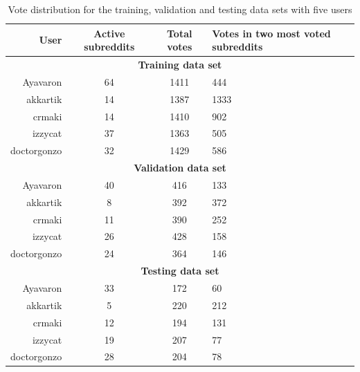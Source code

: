 \begin{table}[H]
    \centering
    \begin{tabular}{ r | c | c | p{4cm}  }
    \hline
    \textbf{User} & \textbf{Active subreddits} & \textbf{Total votes} & \textbf{Votes in two most voted subreddits} \\ \hline \hline
    \multicolumn{4}{c}{\textbf{Training data set}} \\ \hline \hline
    Ayavaron & 64 & 1411 & 444 \\ \hline
    akkartik & 14  & 1387 & 1333 \\ \hline
    crmaki & 14 & 1410 & 902 \\ \hline
    izzycat & 37 & 1363 & 505 \\ \hline
    doctorgonzo & 32 & 1429 & 586 \\ \hline \hline
    \multicolumn{4}{c}{\textbf{Validation data set}} \\ \hline \hline
    Ayavaron & 40 & 416 & 133 \\ \hline
    akkartik & 8  & 392 & 372 \\ \hline
    crmaki & 11 & 390 & 252 \\ \hline
    izzycat & 26 & 428 & 158 \\ \hline
    doctorgonzo & 24 & 364 & 146 \\ \hline \hline
    \multicolumn{4}{c}{\textbf{Testing data set}} \\ \hline \hline
    Ayavaron & 33 & 172 & 60 \\ \hline
    akkartik & 5  & 220 & 212 \\ \hline
    crmaki & 12 & 194 & 131 \\ \hline
    izzycat & 19 & 207 & 77 \\ \hline
    doctorgonzo & 28 & 204 & 78 \\ \hline
    \end{tabular}
    \caption{Vote distribution for the training, validation and testing data sets with five users}
    \label{table:5_user_reddit_dataset}
\end{table}

